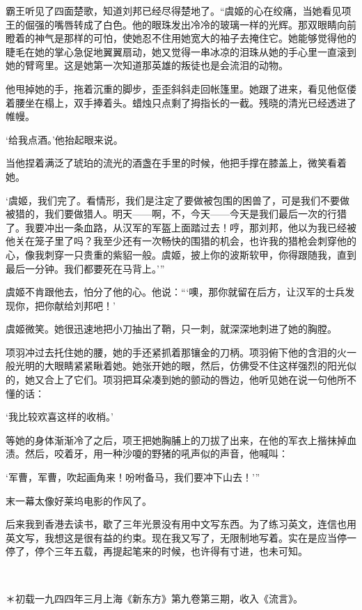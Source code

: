\par 霸王听见了四面楚歌，知道刘邦已经尽得楚地了。“虞姬的心在绞痛，当她看见项王的倔强的嘴唇转成了白色。他的眼珠发出冷冷的玻璃一样的光辉。那双眼睛向前瞪着的神气是那样的可怕，使她忍不住用她宽大的袖子去掩住它。她能够觉得他的睫毛在她的掌心急促地翼翼扇动，她又觉得一串冰凉的泪珠从她的手心里一直滚到她的臂弯里。这是她第一次知道那英雄的叛徒也是会流泪的动物。
\par 他甩掉她的手，拖着沉重的脚步，歪歪斜斜走回帐篷里。她跟了进来，看见他伛偻着腰坐在榻上，双手捧着头。蜡烛只点剩了拇指长的一截。残晓的清光已经透进了帷幔。
\par ‘给我点酒。’他抬起眼来说。
\par 当他捏着满泛了琥珀的流光的酒盏在手里的时候，他把手撑在膝盖上，微笑看着她。
\par ‘虞姬，我们完了。看情形，我们是注定了要做被包围的困兽了，可是我们不要做被猎的，我们要做猎人。明天——啊，不，今天——今天是我们最后一次的行猎了。我要冲出一条血路，从汉军的军盔上面踏过去！哼，那刘邦，他以为我已经被他关在笼子里了吗？我至少还有一次畅快的围猎的机会，也许我的猎枪会刺穿他的心，像我刺穿一只贵重的紫貂一般。虞姬，披上你的波斯软甲，你得跟随我，直到最后一分钟。我们都要死在马背上。’”
\par 虞姬不肯跟他去，怕分了他的心。他说：“‘噢，那你就留在后方，让汉军的士兵发现你，把你献给刘邦吧！’
\par 虞姬微笑。她很迅速地把小刀抽出了鞘，只一刺，就深深地刺进了她的胸膛。
\par 项羽冲过去托住她的腰，她的手还紧抓着那镶金的刀柄。项羽俯下他的含泪的火一般光明的大眼睛紧紧瞅着她。她张开她的眼，然后，仿佛受不住这样强烈的阳光似的，她又合上了它们。项羽把耳朵凑到她的颤动的唇边，他听见她在说一句他所不懂的话：
\par ‘我比较欢喜这样的收梢。’
\par 等她的身体渐渐冷了之后，项王把她胸脯上的刀拔了出来，在他的军衣上揩抹掉血渍。然后，咬着牙，用一种沙嗄的野猪的吼声似的声音，他喊叫：
\par ‘军曹，军曹，吹起画角来！吩咐备马，我们要冲下山去！’”
\par 末一幕太像好莱坞电影的作风了。
\par 后来我到香港去读书，歇了三年光景没有用中文写东西。为了练习英文，连信也用英文写，我想这是很有益的约束。现在我又写了，无限制地写着。实在是应当停一停了，停个三年五载，再提起笔来的时候，也许得有寸进，也未可知。
\par  
\par ＊初载一九四四年三月上海《新东方》第九卷第三期，收入《流言》。


